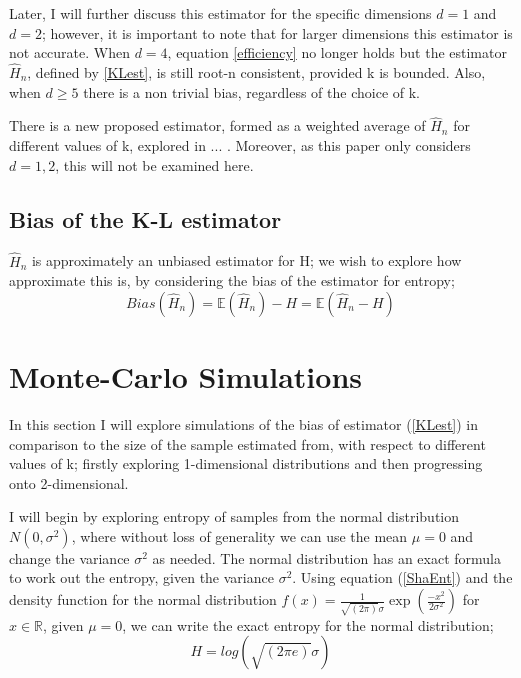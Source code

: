 \documentclass{article}
\begin{document}
Later, I will further discuss this estimator for the specific dimensions $d=1$ and $d=2$; however, it is important to note that for larger dimensions this estimator is not accurate. When $d=4$, equation \ref{efficiency} no longer holds but the estimator $\hat{H}_{n}$, defined by \ref{KLest}, is still root-n consistent, provided k is bounded. Also, when $d \geq 5$ there is a non trivial bias, regardless of the choice of k. 

There is a new proposed estimator, formed as a weighted average of $\hat{H}_{n}$ for different values of k, explored in ... . Moreover, as this paper only considers $d=1, 2$, this will not be examined here.

\subsection{Bias of the K-L estimator}
$\hat{H}_{n}$ is approximately an unbiased estimator for H; we wish to explore how approximate this is, by considering the bias of the estimator for entropy;
\begin{equation} \label{Bias}
Bias(\hat{H}_{n} ) = \mathbb{E}(\hat{H}_{n}) - H = \mathbb{E}(\hat{H}_{n} - H)
\end{equation}



\section{Monte-Carlo Simulations}

In this section I will explore simulations of the bias of estimator (\ref{KLest}) in comparison to the size of the sample estimated from, with respect to different values of k; firstly exploring 1-dimensional distributions and then progressing onto 2-dimensional.

I will begin by exploring entropy of samples from the normal distribution $N(0, \sigma^2)$, where without loss of generality we can use the mean $\mu = 0$ and change the variance $\sigma^2$ as needed. The normal distribution has an exact formula to work out the entropy, given the variance $\sigma^2$. Using equation (\ref{ShaEnt}) and the density function for the normal distribution $f(x) = \frac{1}{\sqrt{(2\pi)} \sigma}\exp{ \left( \frac{-x^2}{2\sigma^2} \right)}$ for $x \in \mathbb{R}$, given $\mu = 0$, we can write the exact entropy for the normal distribution;
\begin{equation}
H = log(\sqrt{(2\pi e)}\sigma)
\end{equation}
\end{document}
